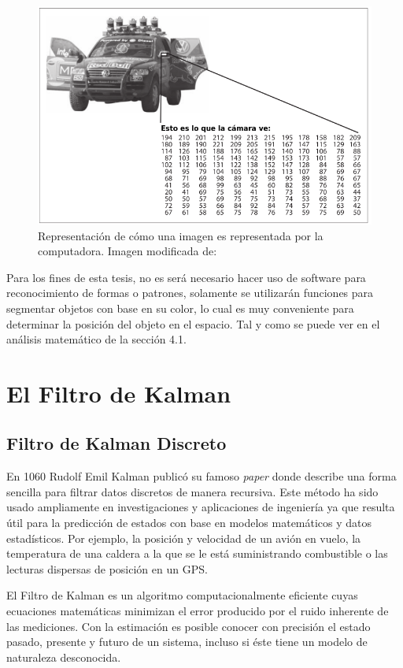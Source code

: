 \begin{figure}
\centering
\includegraphics[scale=0.6]{images/new_representation_image.png}
\caption{Representación de cómo una imagen es representada por la computadora. Imagen modificada de: \cite{bradski2008learning}}
\label{fig:camera_representation}
\end{figure}

Para los fines de esta tesis, no es será necesario hacer uso de software para reconocimiento de formas o patrones, solamente se utilizarán funciones para segmentar objetos con base en su color, lo cual es muy conveniente para determinar la posición del objeto en el espacio. Tal y como se puede ver en el análisis matemático de la sección 4.1.
	
	\section{El Filtro de Kalman}
		\subsection*{Filtro de Kalman Discreto}
	En 1060 Rudolf Emil Kalman publicó su famoso \textit{paper} donde describe una forma sencilla para filtrar datos discretos de manera recursiva. Este método ha sido usado ampliamente en investigaciones y aplicaciones de ingeniería ya que resulta útil para la predicción de estados con base en modelos matemáticos y datos estadísticos. Por ejemplo, la posición y velocidad de un avión en vuelo, la temperatura de una caldera a la que se le está suministrando combustible o las lecturas dispersas de posición en un GPS.

	El Filtro de Kalman es un algoritmo computacionalmente eficiente cuyas ecuaciones matemáticas minimizan el error producido por el ruido inherente de las mediciones. Con la estimación es posible conocer con precisión el estado pasado, presente y futuro de un sistema, incluso si éste tiene un modelo de naturaleza desconocida.
	
